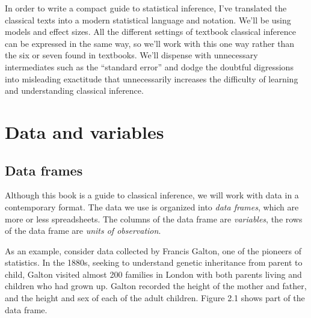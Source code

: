 \documentclass[]{tufte-book}
\begin{document}
In order to write a compact guide to statistical inference, I've translated the classical texts into a modern statistical language and notation. We'll be using models and effect sizes. All the different settings of textbook classical inference can be expressed in the same way, so we'll work with this one way rather than the six or seven found in textbooks. We'll dispense with unnecessary intermediates such as the ``standard error'' and dodge the doubtful digressions into misleading exactitude that unnecessarily increases the difficulty of learning and understanding classical inference.

\hypertarget{data-and-variables}{%
\chapter{Data and variables}\label{data-and-variables}}

\hypertarget{data-frames}{%
\section{Data frames}\label{data-frames}}

Although this book is a guide to classical inference, we will work with data in a contemporary format. The data we use is organized into \emph{data frames}, which are more or less spreadsheets. The columns of the data frame are \emph{variables}, the rows of the data frame are \emph{units of observation}.

As an example, consider data collected by Francis Galton, one of the pioneers of statistics. In the 1880s, seeking to understand genetic inheritance from parent to child, Galton visited almost 200 families in London with both parents living and children who had grown up. Galton recorded the height of the mother and father, and the height and sex of each of the adult children. Figure 2.1 shows part of the data frame.
\end{document}
